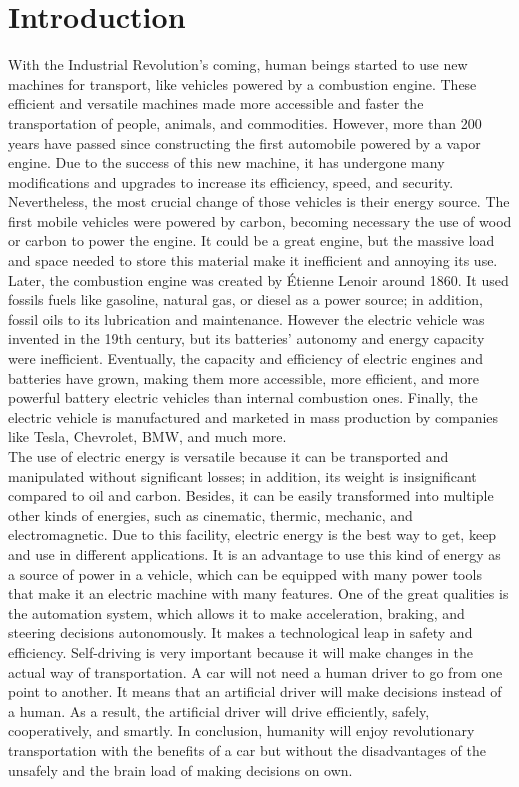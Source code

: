 \chapter{Introduction}
With the Industrial Revolution's coming, human beings started to use new machines for transport, like vehicles powered by a combustion engine. These efficient and versatile machines made more accessible and faster the transportation of people, animals, and commodities. However, more than 200 years have passed since constructing the first automobile powered by a vapor engine. Due to the success of this new machine, it has undergone many modifications and upgrades to increase its efficiency, speed, and security. Nevertheless, the most crucial change of those vehicles is their energy source. The first mobile vehicles were powered by carbon, becoming necessary the use of wood or carbon to power the engine. It could be a great engine, but the massive load and space needed to store this material make it inefficient and annoying its use. Later, the combustion engine was created by Étienne Lenoir around 1860. It used fossils fuels like gasoline, natural gas, or diesel as a power source; in addition, fossil oils to its lubrication and maintenance. However the electric vehicle was invented in the 19th century, but its batteries' autonomy and energy capacity were inefficient. Eventually, the capacity and efficiency of electric engines and batteries have grown, making them more accessible, more efficient, and more powerful battery electric vehicles than internal combustion ones. Finally, the electric vehicle is manufactured and marketed in mass production by companies like Tesla, Chevrolet, BMW, and much more.
\\

The use of electric energy is versatile because it can be transported and manipulated without significant losses; in addition, its weight is insignificant compared to oil and carbon. Besides, it can be easily transformed into multiple other kinds of energies, such as cinematic, thermic, mechanic, and electromagnetic. Due to this facility, electric energy is the best way to get, keep and use in different applications. It is an advantage to use this kind of energy as a source of power in a vehicle, which can be equipped with many power tools that make it an electric machine with many features. One of the great qualities is the automation system, which allows it to make acceleration, braking, and steering decisions autonomously. It makes a technological leap in safety and efficiency. Self-driving is very important because it will make changes in the actual way of transportation. A car will not need a human driver to go from one point to another. It means that an artificial driver will make decisions instead of a human. As a result, the artificial driver will drive efficiently, safely, cooperatively, and smartly. In conclusion, humanity will enjoy revolutionary transportation with the benefits of a car but without the disadvantages of the unsafely and the brain load of making decisions on own.
\\

